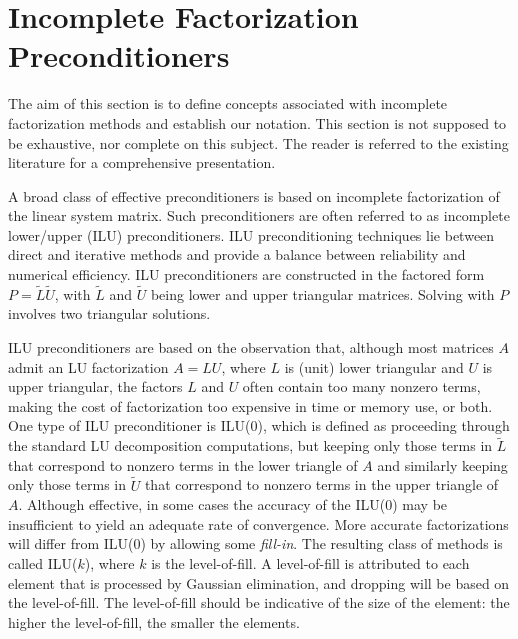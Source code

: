 \section{Incomplete Factorization Preconditioners}
\label{sec:ilu}

The aim of this section is to define concepts associated with incomplete
factorization methods and establish our notation. This section is not
supposed to be exhaustive, nor complete on this subject. The reader is
referred to the existing literature for a comprehensive presentation.

\medskip

A broad class of effective preconditioners is based on incomplete
factorization of the linear system matrix.  Such preconditioners are often
referred to as incomplete lower/upper (ILU) preconditioners.  
ILU preconditioning techniques lie between direct and
iterative methods and provide a balance between reliability and
numerical efficiency.  ILU preconditioners are constructed in the factored form
$P=\tilde{L} \tilde{U}$, with $\tilde{L}$ and $\tilde{U}$ being lower
and upper triangular matrices. Solving with $P$ involves two triangular
solutions.

ILU preconditioners are based on the observation
that, although most matrices $A$ admit an LU factorization $A=LU$, where $L$ is
(unit) lower triangular and $U$ is upper triangular, the factors $L$ and $U$ often
contain too many nonzero terms, making the cost of factorization too expensive in
time or memory use, or both.  One type of ILU preconditioner is ILU(0), which 
is defined as proceeding through the standard LU decomposition computations, but keeping 
only those terms in $\tilde{L}$ that correspond to nonzero terms in the lower
triangle of $A$ and similarly keeping only those terms in $\tilde{U}$ that 
correspond to nonzero terms in the upper triangle of $A$.  Although effective, in
some cases the accuracy of the ILU(0) may be insufficient to yield an
adequate rate of convergence. More accurate factorizations will differ
from ILU(0) by allowing some {\em fill-in}. The resulting class of
methods is called ILU($k$), where $k$ is the level-of-fill. A
level-of-fill is attributed to each element that is processed by
Gaussian elimination, and dropping will be based on the level-of-fill.
The level-of-fill should be indicative of the size of the element: the
higher the level-of-fill, the smaller the elements.  

